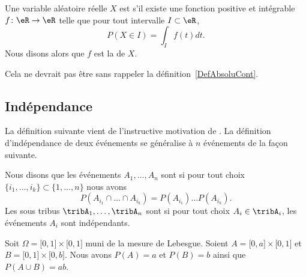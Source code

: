 \begin{definition}
    Une variable aléatoire réelle \( X\) est  s'il existe une fonction positive et intégrable \( f\colon \eR\to \eR\) telle que pour tout intervalle \( I\subset\eR\),
    \begin{equation}
        P(X\in I)=\int_If(t)dt.
    \end{equation}
    Nous disons alors que \( f\) est la  de \( X\).
\end{definition}
Cela ne devrait pas être sans rappeler la définition~\ref{DefAbsoluCont}.

\subsection{Indépendance}

La définition suivante vient de l'instructive motivation de \cite{CourgGudRennes}. La définition d'indépendance de deux événements se généralise à \( n\) événements de la façon suivante.
\begin{definition}      \label{DEFooVYCUooKWvReO}
    Nous disons que les événements \( A_1,\ldots,A_n\) sont  si pour tout choix \( \{ i_1,\ldots,i_k \}\subset\{ 1,\ldots,n \}\) nous avons
    \begin{equation}
        P(A_{i_1}\cap\ldots\cap A_{i_k})=P(A_{i_1})\ldots P(A_{i_k}).
    \end{equation}
    Les sous tribus \( \tribA_1,\ldots,\tribA_n\) sont  si pour tout choix \( A_i\in \tribA_i\), les événements \( A_i\) sont indépendants.
\end{definition}

\begin{example}
    Soit \( \Omega=\mathopen[ 0 , 1 \mathclose]\times \mathopen[ 0 , 1 \mathclose]\) muni de la mesure de Lebesgue. Soient \( A=\mathopen[ 0 , a \mathclose]\times \mathopen[ 0 , 1 \mathclose]\) et \( B=\mathopen[ 0 , 1 \mathclose]\times \mathopen[ 0 , b \mathclose]\). Nous avons \( P(A)=a\) et \( P(B)=b\) ainsi que \( P(A\cup B)=ab\).
\end{example}

